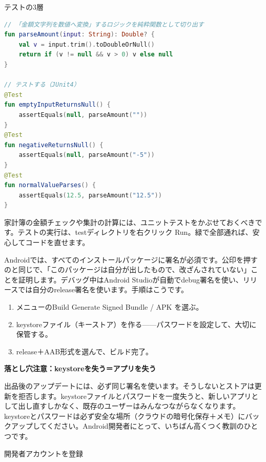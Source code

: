 \begin{center}\small\color{gray}テストの3層\end{center}

\begin{lstlisting}[language=Kotlin]
// 「金額文字列を数値へ変換」するロジックを純粋関数として切り出す
fun parseAmount(input: String): Double? {
    val v = input.trim().toDoubleOrNull()
    return if (v != null && v > 0) v else null
}

// テストする（JUnit4）
@Test
fun emptyInputReturnsNull() {
    assertEquals(null, parseAmount(""))
}
@Test
fun negativeReturnsNull() {
    assertEquals(null, parseAmount("-5"))
}
@Test
fun normalValueParses() {
    assertEquals(12.5, parseAmount("12.5"))
}
\end{lstlisting}

家計簿の金額チェックや集計の計算には、ユニットテストをかぶせておくべきです。テストの実行は、testディレクトリを右クリック Run。緑で全部通れば、安心してコードを直せます。


Androidでは、すべてのインストールパッケージに署名が必須です。公印を押すのと同じで、「このパッケージは自分が出したもので、改ざんされていない」ことを証明します。デバッグ中はAndroid Studioが自動でdebug署名を使い、リリースでは自分のrelease署名を使います。手順はこうです。

\begin{enumerate}
  \item メニューのBuild Generate Signed Bundle / APK を選ぶ。
  \item keystoreファイル（キーストア）を作る——パスワードを設定して、大切に保管する。
  \item release＋AAB形式を選んで、ビルド完了。
\end{enumerate}

\textbf{落とし穴注意：keystoreを失う＝アプリを失う}\par

出品後のアップデートには、必ず同じ署名を使います。そうしないとストアは更新を拒否します。keystoreファイルとパスワードを一度失うと、新しいアプリとして出し直すしかなく、既存のユーザーはみんなつながらなくなります。keystoreとパスワードは必ず安全な場所（クラウドの暗号化保存＋メモ）にバックアップしてください。Android開発者にとって、いちばん高くつく教訓のひとつです。


開発者アカウントを登録

